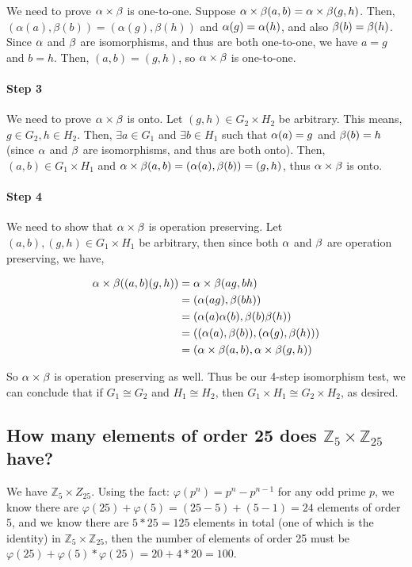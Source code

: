 \documentclass{article}
\newcommand{\Z}{\mathbb{Z}}
\begin{document}
  We need to prove $\alpha \times \beta$ is one-to-one. Suppose $\alpha \times \beta(a,b) = \alpha \times \beta(g,h)$.  Then, $(\alpha(a), \beta(b)) = (\alpha(g), \beta(h))$ and $\alpha(g) = \alpha(h)$, and also $\beta(b) = \beta(h)$.  Since $\alpha$ and $\beta$ are isomorphisms, and thus are both one-to-one, we have $a = g$ and $b = h$.  Then, $(a,b) = (g,h)$, so $\alpha \times \beta$ is one-to-one.

  \paragraph{Step 3}

  We need to prove $\alpha \times \beta$ is onto.  Let $(g,h) \in G_2 \times H_2$ be arbitrary.  This means, $g \in G_2, h \in H_2$.  Then, $\exists a \in G_1$ and $\exists b \in H_1$ such that $\alpha(a) = g$ and $\beta(b) = h$ (since $\alpha$ and $\beta$ are isomorphisms, and thus are both onto).  Then, $(a,b) \in G_1 \times H_1$ and $\alpha \times \beta(a,b) = (\alpha(a),\beta(b)) = (g,h)$, thus $\alpha \times \beta$ is onto.

  \paragraph{Step 4}

  We need to show that $\alpha \times \beta$ is operation preserving.  Let $(a,b), (g,h) \in G_1 \times H_1$ be arbitrary, then since both $\alpha$ and $\beta$ are operation preserving, we have,

  \begin{align*}
    \alpha \times \beta((a,b)(g,h)) &= \alpha \times \beta(ag,bh) \\
    &= (\alpha(ag),\beta(bh)) \\
    &= (\alpha(a)\alpha(b), \beta(b)\beta(h)) \\
    &= ((\alpha(a),\beta(b)), (\alpha(g),\beta(h))) \\
    &= (\alpha \times \beta(a,b), \alpha \times \beta(g,h)) \\
  \end{align*}

  So $\alpha \times \beta$ is operation preserving as well.  Thus be our 4-step isomorphism test, we can conclude that if $G_1 \cong G_2$ and $H_1 \cong H_2$, then $G_1 \times H_1 \cong G_2 \times H_2$, as desired.

  \subsection{How many elements of order 25 does $\Z_5 \times \Z_{25}$ have? }
    
  We have $\Z_5 \times Z_{25}$.  Using the fact: $\varphi(p^n) = p^n - p^{n-1}$ for any odd prime $p$, we know there are $\varphi(25) + \varphi(5) = (25 - 5) + (5 - 1) = 24$ elements of order 5, and we know there are $5 * 25 = 125$ elements in total (one of which is the identity) in $\Z_5 \times \Z_{25}$, then the number of elements of order 25 must be $\varphi(25) + \varphi(5) * \varphi(25) = 20 + 4 * 20 = 100$.
\end{document}
